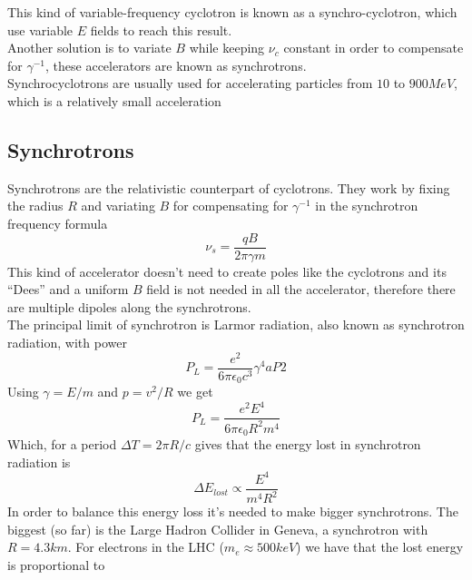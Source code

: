 \documentclass[../qm.tex]{subfiles}
\begin{document}
This kind of variable-frequency cyclotron is known as a synchro-cyclotron, which use variable $E$ fields to reach this result.\\
Another solution is to variate $B$ while keeping $\nu_c$ constant in order to compensate for $\gamma^{-1}$, these accelerators are known as synchrotrons.\\
Synchrocyclotrons are usually used for accelerating particles from $10$ to $900\unit{MeV}$, which is a relatively small acceleration
\subsection{Synchrotrons}
Synchrotrons are the relativistic counterpart of cyclotrons. They work by fixing the radius $R$ and variating $B$ for compensating for $\gamma^{-1}$ in the synchrotron frequency formula
\begin{equation}
	\nu_s=\frac{qB}{2\pi\gamma m}
	\label{eq:synchrotronfreq}
\end{equation}
This kind of accelerator doesn't need to create poles like the cyclotrons and its ``Dees'' and a uniform $B$ field is not needed in all the accelerator, therefore there are multiple dipoles along the synchrotrons.\\
The principal limit of synchrotron is Larmor radiation, also known as synchrotron radiation, with power
\begin{equation}
	P_L=\frac{e^2}{6\pi\epsilon_0c^3}\gamma^4aP 2
	\label{eq:synchrad}
\end{equation}
Using $\gamma=E/m$ and $p=v^2/R$ we get
\begin{equation}
	P_L=\frac{e^2E^4}{6\pi\epsilon_0R^2m^4}
	\label{eq:synchrad2}
\end{equation}
Which, for a period $\Delta T=2\pi R/c$ gives that the energy lost in synchrotron radiation is
\begin{equation*}
	\Delta E_{lost}\propto\frac{E^4}{m^4R^2}
\end{equation*}
In order to balance this energy loss it's needed to make bigger synchrotrons. The biggest (so far) is the Large Hadron Collider in Geneva, a synchrotron with $R=4.3\unit{km}$. For electrons in the LHC ($m_e\approx500\unit{keV}$) we have that the lost energy is proportional to
\end{document}
